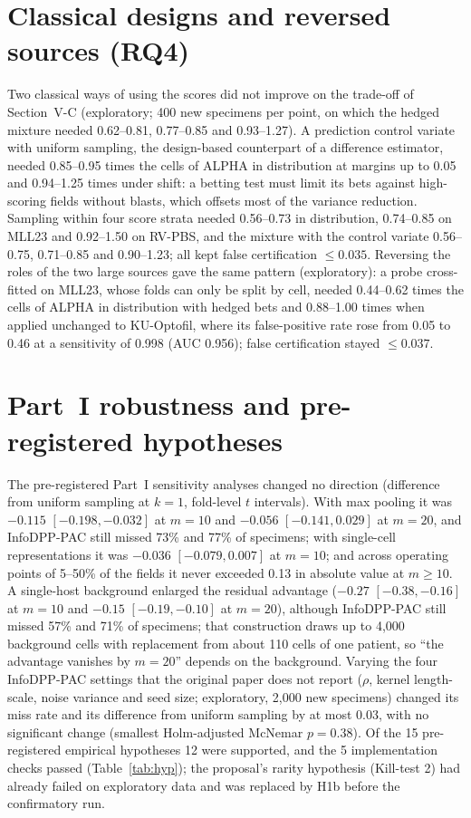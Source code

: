 \documentclass[journal]{IEEEtran}
\begin{document}
\section{Classical designs and reversed sources (RQ4)}
Two classical ways of using the scores did not improve on the trade-off of Section~V-C (exploratory; 400 new specimens per point, on which the hedged mixture needed 0.62--0.81, 0.77--0.85 and 0.93--1.27). A prediction control variate with uniform sampling, the design-based counterpart of a difference estimator, needed 0.85--0.95 times the cells of ALPHA in distribution at margins up to 0.05 and 0.94--1.25 times under shift: a betting test must limit its bets against high-scoring fields without blasts, which offsets most of the variance reduction. Sampling within four score strata needed 0.56--0.73 in distribution, 0.74--0.85 on MLL23 and 0.92--1.50 on RV-PBS, and the mixture with the control variate 0.56--0.75, 0.71--0.85 and 0.90--1.23; all kept false certification $\le0.035$. Reversing the roles of the two large sources gave the same pattern (exploratory): a probe cross-fitted on MLL23, whose folds can only be split by cell, needed 0.44--0.62 times the cells of ALPHA in distribution with hedged bets and 0.88--1.00 times when applied unchanged to KU-Optofil, where its false-positive rate rose from 0.05 to 0.46 at a sensitivity of 0.998 (AUC 0.956); false certification stayed $\le0.037$.

\section{Part~I robustness and pre-registered hypotheses}
The pre-registered Part~I sensitivity analyses changed no direction (difference from uniform sampling at $k=1$, fold-level $t$ intervals). With max pooling it was $-0.115$ $[-0.198,-0.032]$ at $m=10$ and $-0.056$ $[-0.141,0.029]$ at $m=20$, and InfoDPP-PAC still missed 73\% and 77\% of specimens; with single-cell representations it was $-0.036$ $[-0.079,0.007]$ at $m=10$; and across operating points of 5--50\% of the fields it never exceeded 0.13 in absolute value at $m\ge10$. A single-host background enlarged the residual advantage ($-0.27$ $[-0.38,-0.16]$ at $m=10$ and $-0.15$ $[-0.19,-0.10]$ at $m=20$), although InfoDPP-PAC still missed 57\% and 71\% of specimens; that construction draws up to 4,000 background cells with replacement from about 110 cells of one patient, so ``the advantage vanishes by $m=20$'' depends on the background. Varying the four InfoDPP-PAC settings that the original paper does not report ($\rho$, kernel length-scale, noise variance and seed size; exploratory, 2,000 new specimens) changed its miss rate and its difference from uniform sampling by at most 0.03, with no significant change (smallest Holm-adjusted McNemar $p=0.38$). Of the 15 pre-registered empirical hypotheses 12 were supported, and the 5 implementation checks passed (Table~\ref{tab:hyp}); the proposal's rarity hypothesis (Kill-test 2) had already failed on exploratory data and was replaced by H1b before the confirmatory run.
\end{document}
